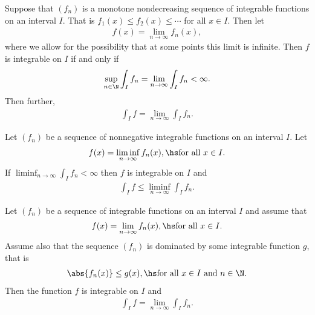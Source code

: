 \documentclass{article}
\begin{document}
\begin{theorem}
    Suppose that $(f_n)$ is a monotone nondecreasing sequence of integrable functions on an interval $I$. That is 
    $f_1(x) \leq f_2(x) \leq \cdots$ for all $x\in I$. Then let 
    \begin{align*}
        f(x) = \lim_{n\to\infty}f_n(x),
    \end{align*} 
    where we allow for the possibility that at some points this limit is infinite. Then $f$ is integrable on $I$
    if and only if 
    \begin{align*}
        \sup_{n\in\N}\int_I f_n = \lim_{n\to\infty}\int_I f_n < \infty.
    \end{align*}
    Then further, 
    \begin{align*}
        \int_I f = \lim_{n\to\infty} \int_I f_n.
    \end{align*}
\end{theorem}

\begin{lemma}
    Let $(f_n)$ be a sequence of nonnegative integrable functions on an interval $I$. Let 
    \begin{align*}
        f(x) = \liminf_{n\to\infty} f_n(x), \hs\text{for all $x\in I$}.
    \end{align*}
    If $\liminf_{n\to\infty}\int_I f_n<\infty$ then $f$ is integrable on $I$ and 
    \begin{align*}
        \int_I f \leq \liminf_{n\to\infty} \int_I f_n.
    \end{align*}
\end{lemma}

\begin{theorem}
    Let $(f_n)$ be a sequence of integrable functions on an interval $I$ and assume that 
    \begin{align*}
        f(x) = \lim_{n\to\infty} f_n(x), \hs \text{for all $x\in I$}.
    \end{align*} 
    Assume also that the sequence $(f_n)$ is dominated by some integrable function $g$, that is 
    \begin{align*}
        \abs{f_n(x)} \leq g(x), \hs \text{for all $x\in I$ and $n\in\N$.}
    \end{align*}
    Then the function $f$ is integrable on $I$ and 
    \begin{align*}
        \int_I f = \lim_{n\to\infty} \int_I f_n.
    \end{align*}
\end{theorem}
\end{document}
